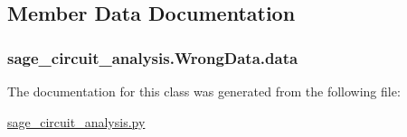 \subsection{Member Data Documentation}
\hypertarget{classsage__circuit__analysis_1_1WrongData_a9a1aea6b908390729190f88ef869023c}{
\subsubsection[{data}]{\setlength{\rightskip}{0pt plus 5cm}sage\-\_\-circuit\-\_\-analysis.\-Wrong\-Data.\-data}}\label{classsage__circuit__analysis_1_1WrongData_a9a1aea6b908390729190f88ef869023c}


The documentation for this class was generated from the following file\-:\begin{DoxyCompactItemize}
\item 
\hyperlink{sage__circuit__analysis_8py}{sage\-\_\-circuit\-\_\-analysis.\-py}\end{DoxyCompactItemize}
